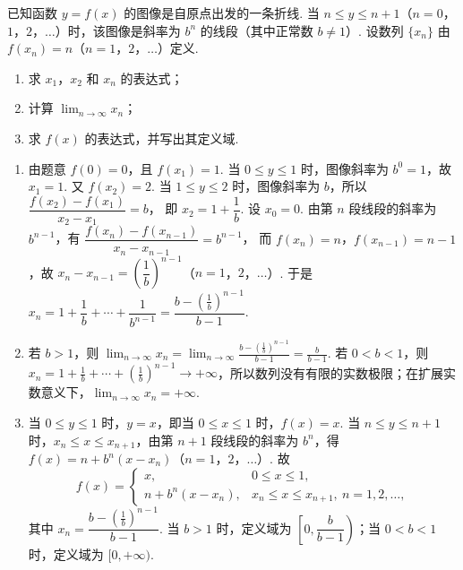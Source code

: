 \documentclass[UTF8,a4paper,oneside,11pt]{ctexbook}
\begin{document}
\begin{problem}
已知函数 \(y=f(x)\) 的图像是自原点出发的一条折线. 当 \(n\le y\le n+1\)（\(n=0\)，\(1\)，\(2\)，\(\dots\)）时，该图像是斜率为 \(b^n\) 的线段（其中正常数 \(b\neq 1\)）. 设数列 \(\{x_n\}\) 由 \(f(x_n)=n\)（\(n=1\)，\(2\)，\(\dots\)）定义.

\begin{enumerate}
\item 求 \(x_1\)，\(x_2\) 和 \(x_n\) 的表达式；
\item 计算 \(\displaystyle\lim_{n\to\infty}x_n\)；
\item 求 \(f(x)\) 的表达式，并写出其定义域.
\end{enumerate}
\end{problem}

\begin{solution}
\begin{enumerate}
\item 由题意 \(f(0)=0\)，且 \(f(x_1)=1\). 当 \(0\le y\le 1\) 时，图像斜率为 \(b^0=1\)，故 \(x_1=1\).
又 \(f(x_2)=2\). 当 \(1\le y\le 2\) 时，图像斜率为 \(b\)，所以
\(\dfrac{f(x_2)-f(x_1)}{x_2-x_1}=b\)，
即 \(x_2=1+\dfrac1b\).
设 \(x_0=0\). 由第 \(n\) 段线段的斜率为 \(b^{n-1}\)，有
\(\dfrac{f(x_n)-f(x_{n-1})}{x_n-x_{n-1}}=b^{n-1}\)，
而 \(f(x_n)=n\)，\(f(x_{n-1})=n-1\)，故
\(x_n-x_{n-1}=\left(\dfrac1b\right)^{n-1}\)（\(n=1\)，\(2\)，\(\dots\)）.
于是
\(x_n=1+\dfrac1b+\cdots+\dfrac1{b^{n-1}}
=\dfrac{b-\left(\frac1b\right)^{n-1}}{b-1}\).

\item 若 \(b>1\)，则
\(\displaystyle\lim_{n\to\infty}x_n=\displaystyle\lim_{n\to\infty}\frac{b-\left(\frac1b\right)^{n-1}}{b-1}=\frac{b}{b-1}\).
若 \(0<b<1\)，则 \(x_n=1+\frac1b+\cdots+\left(\frac1b\right)^{n-1}\to +\infty\)，所以数列没有有限的实数极限；在扩展实数意义下，\(\displaystyle\lim_{n\to\infty}x_n=+\infty\).

\item 当 \(0\le y\le 1\) 时，\(y=x\)，即当 \(0\le x\le 1\) 时，\(f(x)=x\). 当 \(n\le y\le n+1\) 时，\(x_n\le x\le x_{n+1}\)，由第 \(n+1\) 段线段的斜率为 \(b^n\)，得
\(f(x)=n+b^n(x-x_n)\)（\(n=1\)，\(2\)，\(\dots\)）.
故
\[
f(x)=
\begin{cases}
x, & 0\le x\le 1,\\
n+b^n(x-x_n), & x_n\le x\le x_{n+1},\ n=1,2,\dots,
\end{cases}
\]
其中 \(x_n=\dfrac{b-\left(\frac1b\right)^{n-1}}{b-1}\). 当 \(b>1\) 时，定义域为 \(\left[0,\dfrac{b}{b-1}\right)\)；当 \(0<b<1\) 时，定义域为 \([0,+\infty)\).
\end{enumerate}
\end{solution}
\end{document}
